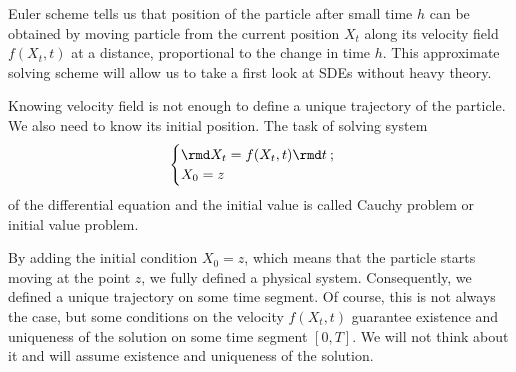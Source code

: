 Euler scheme tells us that position of the particle after small time $h$ can be obtained by moving particle from the current position $X_t$ along its velocity field $f(X_t, t)$ at a distance, proportional to the change in time $h$. This approximate solving scheme will allow us to take a first look at SDEs without heavy theory.

Knowing velocity field is not enough to define a unique trajectory of the particle. We also need to know its initial position. The task of solving system
\begin{equation}\label{eq:cauchy}
    \begin{cases}
        \rmd X_t = f(X_t, t) \rmd t\:;\\
        X_0 = z
    \end{cases}
\end{equation}
of the differential equation and the initial value is called Cauchy problem or initial value problem.

By adding the initial condition $X_0 = z$, which means that the particle starts moving at the point $z$, we fully defined a physical system. Consequently, we defined a unique trajectory on some time segment. Of course, this is not always the case, but some conditions on the velocity $f(X_t, t)$ guarantee existence and uniqueness of the solution on some time segment $[0, T]$. We will not think about it and will assume existence and uniqueness of the solution.

